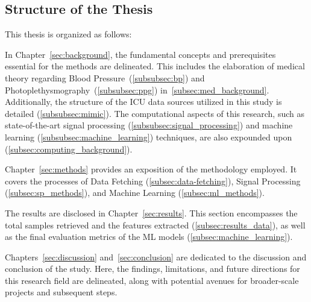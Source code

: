 \subsection{Structure of the Thesis}
\label{subsec:structure}

This thesis is organized as follows:

In Chapter~\ref{sec:background}, the fundamental concepts and prerequisites essential for the methods are delineated.
This includes the elaboration of medical theory regarding Blood Pressure~(\ref{subsubsec:bp}) and Photoplethysmography~(\ref{subsubsec:ppg}) in~\ref{subsec:med_background}.
Additionally, the structure of the ICU data sources utilized in this study is detailed (\ref{subsubsec:mimic}).
The computational aspects of this research, such as state-of-the-art signal processing (\ref{subsubsec:signal_processing}) and machine learning (\ref{subsubsec:machine_learning}) techniques, are also expounded upon (\ref{subsec:computing_background}).

Chapter~\ref{sec:methods} provides an exposition of the methodology employed.
It covers the processes of Data Fetching (\ref{subsec:data-fetching}), Signal Processing (\ref{subsec:sp_methods}), and Machine Learning (\ref{subsec:ml_methods}).

The results are disclosed in Chapter~\ref{sec:results}.
This section encompasses the total samples retrieved and the features extracted (\ref{subsec:results_data}), as well as the final evaluation metrics of the ML models (\ref{subsec:machine_learning}).

Chapters~\ref{sec:discussion} and~\ref{sec:conclusion} are dedicated to the discussion and conclusion of the study.
Here, the findings, limitations, and future directions for this research field are delineated, along with potential avenues for broader-scale projects and subsequent steps.
